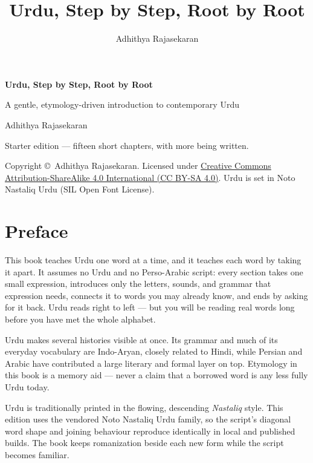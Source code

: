 \documentclass[11pt,twoside]{book}
\title{\Huge Urdu, Step by Step, Root by Root}
\author{Adhithya Rajasekaran}
\date{}
\begin{document}
\frontmatter

\begin{titlepage}
  \centering
  \vspace*{3cm}
  {\Huge\bfseries Urdu, Step by Step, Root by Root\par}
  \vspace{1cm}
  {\Large A gentle, etymology-driven introduction to contemporary Urdu\par}
  \vspace{1.5cm}
  {\large Adhithya Rajasekaran\par}
  \vfill
  {\large Starter edition --- fifteen short chapters, with more being written.\par}
  \vspace{2cm}
  {\normalsize
    Copyright \copyright\ Adhithya Rajasekaran. Licensed under
    \href{https://creativecommons.org/licenses/by-sa/4.0/}%
    {Creative Commons Attribution-ShareAlike 4.0 International (CC BY-SA 4.0)}.
    Urdu is set in Noto Nastaliq Urdu (SIL Open Font License).\par
  }
\end{titlepage}

\chapter*{Preface}

This book teaches Urdu one word at a time, and it teaches each word by taking it
apart. It assumes no Urdu and no Perso-Arabic script: every section takes one
small expression, introduces only the letters, sounds, and grammar that
expression needs, connects it to words you may already know, and ends by asking
for it back. Urdu reads right to left --- but you will be reading real words
long before you have met the whole alphabet.

Urdu makes several histories visible at once. Its grammar and much of its
everyday vocabulary are Indo-Aryan, closely related to Hindi, while Persian and
Arabic have contributed a large literary and formal layer on top. Etymology in
this book is a memory aid --- never a claim that a borrowed word is any less
fully Urdu today.

Urdu is traditionally printed in the flowing, descending \emph{Nastaliq}
style. This edition uses the vendored Noto Nastaliq Urdu family, so the script's
diagonal word shape and joining behaviour reproduce identically in local and
published builds. The book keeps romanization beside each new form while the
script becomes familiar.
\end{document}
